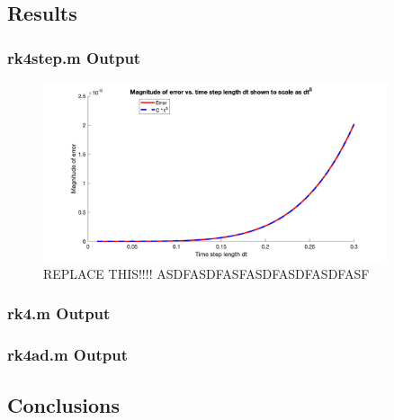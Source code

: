 \documentclass[10pt]{article}
\begin{document}
\subsection*{Results}

\subsubsection*{rk4step.m Output}

\begin{figure}[H]
\centering
\includegraphics[width=0.9\textwidth]{rk4step.png}
\caption{REPLACE THIS!!!! ASDFASDFASFASDFASDFASDFASF}
\end{figure}

\subsubsection*{rk4.m Output}

\subsubsection*{rk4ad.m Output}


\subsection*{Conclusions}


\pagebreak

\end{document}
